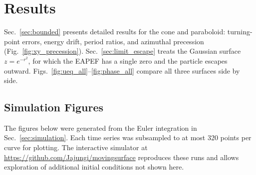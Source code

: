 \documentclass[11pt,letterpaper]{article}
\begin{document}
\section{Results}
\label{sec:results}

Sec.~\ref{sec:bounded} presents detailed results for the cone and paraboloid: turning-point errors, energy drift, period ratios, and azimuthal precession (Fig.~\ref{fig:xy_precession}). Sec.~\ref{sec:limit_escape} treats the Gaussian surface $z=e^{-r^2}$, for which the EAPEF has a single zero and the particle escapes outward. Figs.~\ref{fig:ueq_all}--\ref{fig:phase_all} compare all three surfaces side by side.

\subsection{Simulation Figures}
\label{sec:graphs}

The figures below were generated from the Euler integration in Sec.~\ref{sec:simulation}. Each time series was subsampled to at most 320 points per curve for plotting. The interactive simulator at \url{https://github.com/Jajungi/movingsurface} reproduces these runs and allows exploration of additional initial conditions not shown here.
\end{document}
